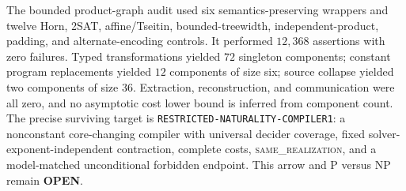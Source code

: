 \documentclass[11pt]{article}
\newcommand{\same}{\textnormal{\textsc{same\_realization}}}
\begin{document}
The bounded product-graph audit used six semantics-preserving wrappers and
twelve Horn, 2SAT, affine/Tseitin, bounded-treewidth, independent-product,
padding, and alternate-encoding controls.  It performed \(12{,}368\)
assertions with zero failures.  Typed transformations yielded \(72\)
singleton components; constant program replacements yielded \(12\) components
of size six; source collapse yielded two components of size \(36\).  Extraction,
reconstruction, and communication were all zero, and no asymptotic cost lower
bound is inferred from component count.  The precise surviving target is
\texttt{RESTRICTED-NATURALITY-COMPILER1}: a nonconstant core-changing compiler
with universal decider coverage, fixed solver-exponent-independent contraction,
complete costs, \same{}, and a model-matched unconditional forbidden endpoint.
This arrow and P versus NP remain \textbf{OPEN}.
\end{document}

